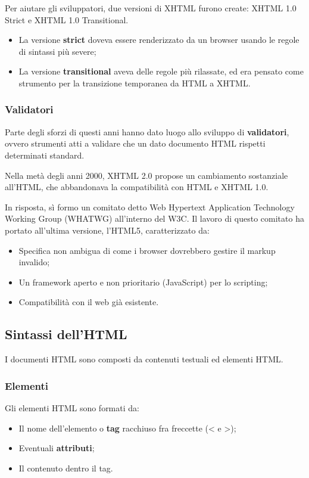 \documentclass[a4paper,11pt]{article}
\begin{document}
Per aiutare gli sviluppatori, due versioni di XHTML furono create: XHTML 1.0 Strict e XHTML 1.0 Transitional.

\begin{itemize}
	\item La versione \textbf{strict} doveva essere renderizzato da un browser usando le regole di sintassi più severe;
	\item La versione \textbf{transitional} aveva delle regole più rilassate, ed era pensato come strumento per la transizione temporanea da HTML a XHTML.
\end{itemize}

\subsubsection{Validatori}
Parte degli sforzi di questi anni hanno dato luogo allo sviluppo di \textbf{validatori}, ovvero strumenti atti a validare che un dato documento HTML rispetti determinati standard.

\par\medskip

Nella metà degli anni 2000, XHTML 2.0 propose un cambiamento sostanziale all'HTML, che abbandonava la compatibilità con HTML e XHTML 1.0.

In risposta, sì formo un comitato detto Web Hypertext Application Technology Working Group (WHATWG) all'interno del W3C.
Il lavoro di questo comitato ha portato all'ultima versione, l'HTML5, caratterizzato da:
\begin{itemize}
	\item Specifica non ambigua di come i browser dovrebbero gestire il markup invalido;
	\item Un framework aperto e non prioritario (JavaScript) per lo scripting;
	\item Compatibilità con il web già esistente.
\end{itemize}

\subsection{Sintassi dell'HTML}
I documenti HTML sono composti da contenuti testuali ed elementi HTML.

\subsubsection{Elementi}
Gli elementi HTML sono formati da:
\begin{itemize}
	\item Il nome dell'elemento o \textbf{tag} racchiuso fra freccette (< e >);
	\item Eventuali \textbf{attributi};
	\item Il contenuto dentro il tag.
\end{itemize}
\end{document}
